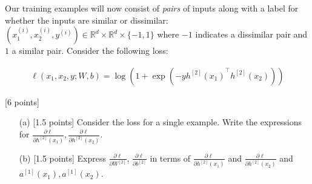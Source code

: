 \documentclass{article}
\newif\ifsolutions
\newenvironment{labelledanswer}{{\bf Answer:} \sf }{}%
\newcommand{\answer}[2]
{{
\ifsolutions
\begin{labelledanswer}
\color{red} 
#2
\end{labelledanswer}
\else
#1
\fi
}}
\begin{document}
Our training examples will now consist of \textit{pairs} of inputs along with a label for whether the inputs are similar or dissimilar: $(x^{(i)}_1, x^{(i)}_2, y^{(i)}) \in \mathbb{R}^{d} \times \mathbb{R}^d \times \{-1, 1\}$ where $-1$ indicates a dissimilar pair and $1$ a similar pair. Consider the following loss:

\begin{align}
    \ell(x_1, x_2, y; W, b) = \log\left(1 + \exp(-y{h^{[2]}(x_1)}^\top h^{[2]}(x_2))\right)
\end{align}

\noindent {} [6 points]

\begin{itemize}
    \item [(a)] [1.5 points] Consider the loss for a single example. Write the expressions for $\frac{\partial \ell}{\partial h^{[2]}(x_1)},  \frac{\partial \ell}{\partial h^{[2]}(x_2)}$. 
    
    \answer{}{

$$
\frac{\partial}{\partial h^{[2]}(x_1)} \ell(x_1, x_2, y; W, b)= \frac{1}{1 + \exp(-y{h^{[2]}(x_1)}^\top h^{[2]}(x_2))} \;  \left(  0 + \exp(-y{h^{[2]}(x_1)}^\top h^{[2]}(x_2)) (-y h^{[2]}(x_2))   \right)
$$
$$
= \frac{ (-y h^{[2]}(x_2)) e^{(-y{h^{[2]}(x_1)}^\top h^{[2]}(x_2))}}{1 + e^{(-y{h^{[2]}(x_1)}^\top h^{[2]}(x_2))}}
$$

$$
\frac{\partial}{\partial h^{[2]}(x_2)} \ell(x_1, x_2, y; W, b)= \frac{1}{1 + \exp(-y{h^{[2]}(x_1)}^\top h^{[2]}(x_2))} \;  \left(  0 + \exp(-y{h^{[2]}(x_1)}^\top h^{[2]}(x_2)) (-y {h^{[2]}(x_1))}^\top   \right)
$$
$$
= \frac{ (-y {h^{[2]}(x_1)}^\top) e^{(-y{h^{[2]}(x_1)}^\top h^{[2]}(x_2))}}{1 + e^{(-y{h^{[2]}(x_1)}^\top h^{[2]}(x_2))}} 
$$           
    }
    
    \item [(b)] [1.5 points] Express $\frac{\partial \ell}{\partial W^{[2]}}$, $\frac{\partial \ell}{\partial b^{[2]}}$ in terms of $\frac{\partial \ell}{\partial h^{[2]}(x_1)}$ and $\frac{\partial \ell}{\partial h^{[2]}(x_2)}$ and $a^{[1]}(x_1), a^{[1]}(x_2)$.
    
    \answer{}{
$$
    \ell(x_1, x_2, y; W, b) = \log\left(1 + \exp(-y{h^{[2]}(x_1)}^\top h^{[2]}(x_2))\right) 
$$
$$
= \log\left(1 + \exp(-y{(W^{[2]}a^{[1]}(x_1) + b^{[2]})}^\top  (W^{[2]}a^{[1]}(x_2) + b^{[2]}))\right)
$$
$$
= \log\left(1 + e^{{(-yW^{[2]}a^{[1]}(x_1)}^\top - {yb^{[2]}}^\top )  (W^{[2]}a^{[1]}(x_2) + b^{[2]})}\right)
$$
$$
= \log\left(1 + e^{{(-yW^{[2]}a^{[1]}(x_1)}^\top - {yb^{[2]}}^\top )  (W^{[2]}a^{[1]}(x_2) + b^{[2]})}\right)
$$   
    
}
\end{itemize}
\end{document}
